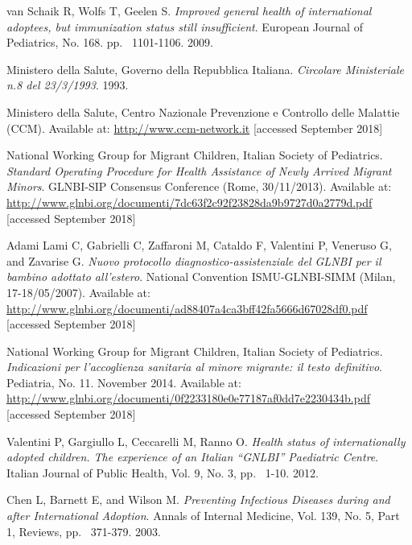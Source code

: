 \begin{thebibliography}{50}
  van Schaik R, Wolfs T, Geelen S.
  \textit{Improved general health of international adoptees, but immunization status still insufficient}.
  European Journal of Pediatrics, No. 168.
  pp. ~1101-1106.
  2009.
  
  Ministero della Salute, Governo della Repubblica Italiana.
  \textit{Circolare Ministeriale n.8 del 23/3/1993}.
  1993.

  Ministero della Salute, Centro Nazionale Prevenzione e Controllo delle Malattie (CCM).  
  Available at: \url{http://www.ccm-network.it} [accessed September 2018]
  
  National Working Group for Migrant Children, Italian Society of Pediatrics.
  \textit{Standard Operating Procedure for Health Assistance of Newly Arrived Migrant Minors}.
  GLNBI-SIP Consensus Conference (Rome, 30/11/2013).
  Available at: \url{http://www.glnbi.org/documenti/7dc63f2c92f23828da9b9727d0a2779d.pdf} [accessed September 2018]
  
  Adami Lami C, Gabrielli C, Zaffaroni M, Cataldo F, Valentini P, Veneruso G, and Zavarise G.
  \textit{Nuovo protocollo diagnostico-assistenziale del GLNBI per il bambino adottato all'estero}.
   National Convention ISMU-GLNBI-SIMM (Milan, 17-18/05/2007).
  Available at: \url{http://www.glnbi.org/documenti/ad88407a4ca3bff42fa5666d67028df0.pdf} [accessed September 2018]
  
  National Working Group for Migrant Children, Italian Society of Pediatrics.
  \textit{Indicazioni per l’accoglienza sanitaria al minore migrante: il testo definitivo}.
  Pediatria, No. 11.
  November 2014.
  Available at: \url{http://www.glnbi.org/documenti/0f2233180e0e77187af0dd7e2230434b.pdf} [accessed September 2018]
  
  Valentini P, Gargiullo L, Ceccarelli M, Ranno O.
  \textit{Health status of internationally adopted children. The experience of an Italian “GNLBI” Paediatric Centre}.
  Italian Journal of Public Health, Vol. 9, No. 3,
  pp. ~1-10.
  2012.
  
  Chen L, Barnett E, and Wilson M.
  \textit{Preventing Infectious Diseases during and after International Adoption}.
  Annals of Internal Medicine, Vol. 139, No. 5, Part 1,
  Reviews,
  pp. ~371-379.
  2003.
  

\end{thebibliography}
